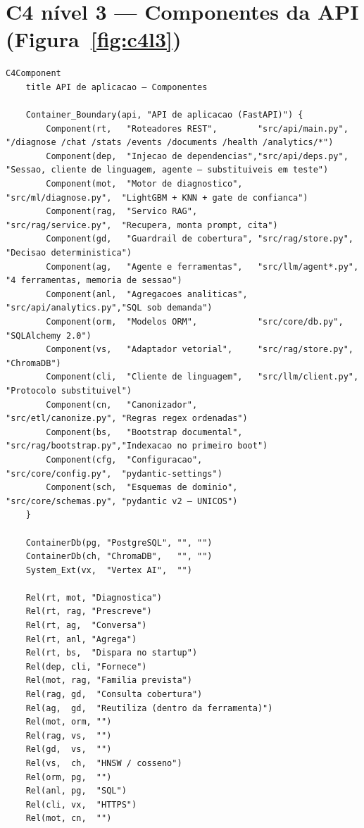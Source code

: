 \section{C4 nível 3 --- Componentes da API (Figura~\ref{fig:c4l3})}

\begin{lstlisting}[language=mermaid, caption={C4 nível 3 --- componentes do contêiner de API}, label={lst:mmc4l3}]
C4Component
    title API de aplicacao — Componentes

    Container_Boundary(api, "API de aplicacao (FastAPI)") {
        Component(rt,   "Roteadores REST",        "src/api/main.py",     "/diagnose /chat /stats /events /documents /health /analytics/*")
        Component(dep,  "Injecao de dependencias","src/api/deps.py",     "Sessao, cliente de linguagem, agente — substituiveis em teste")
        Component(mot,  "Motor de diagnostico",   "src/ml/diagnose.py",  "LightGBM + KNN + gate de confianca")
        Component(rag,  "Servico RAG",            "src/rag/service.py",  "Recupera, monta prompt, cita")
        Component(gd,   "Guardrail de cobertura", "src/rag/store.py",    "Decisao deterministica")
        Component(ag,   "Agente e ferramentas",   "src/llm/agent*.py",   "4 ferramentas, memoria de sessao")
        Component(anl,  "Agregacoes analiticas",  "src/api/analytics.py","SQL sob demanda")
        Component(orm,  "Modelos ORM",            "src/core/db.py",      "SQLAlchemy 2.0")
        Component(vs,   "Adaptador vetorial",     "src/rag/store.py",    "ChromaDB")
        Component(cli,  "Cliente de linguagem",   "src/llm/client.py",   "Protocolo substituivel")
        Component(cn,   "Canonizador",            "src/etl/canonize.py", "Regras regex ordenadas")
        Component(bs,   "Bootstrap documental",   "src/rag/bootstrap.py","Indexacao no primeiro boot")
        Component(cfg,  "Configuracao",           "src/core/config.py",  "pydantic-settings")
        Component(sch,  "Esquemas de dominio",    "src/core/schemas.py", "pydantic v2 — UNICOS")
    }

    ContainerDb(pg, "PostgreSQL", "", "")
    ContainerDb(ch, "ChromaDB",   "", "")
    System_Ext(vx,  "Vertex AI",  "")

    Rel(rt, mot, "Diagnostica")
    Rel(rt, rag, "Prescreve")
    Rel(rt, ag,  "Conversa")
    Rel(rt, anl, "Agrega")
    Rel(rt, bs,  "Dispara no startup")
    Rel(dep, cli, "Fornece")
    Rel(mot, rag, "Familia prevista")
    Rel(rag, gd,  "Consulta cobertura")
    Rel(ag,  gd,  "Reutiliza (dentro da ferramenta)")
    Rel(mot, orm, "")
    Rel(rag, vs,  "")
    Rel(gd,  vs,  "")
    Rel(vs,  ch,  "HNSW / cosseno")
    Rel(orm, pg,  "")
    Rel(anl, pg,  "SQL")
    Rel(cli, vx,  "HTTPS")
    Rel(mot, cn,  "")
\end{lstlisting}

